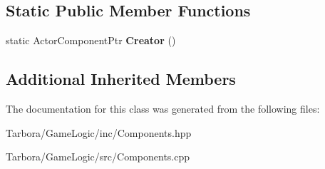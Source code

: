 \subsection*{Static Public Member Functions}
\begin{DoxyCompactItemize}
\item 
\mbox{\label{classTarbora_1_1ModelComponent_ad1ca161fc8a28d0dfd3da1d6a1ddca08}} 
static Actor\+Component\+Ptr {\bfseries Creator} ()
\end{DoxyCompactItemize}
\subsection*{Additional Inherited Members}


The documentation for this class was generated from the following files\+:\begin{DoxyCompactItemize}
\item 
Tarbora/\+Game\+Logic/inc/Components.\+hpp\item 
Tarbora/\+Game\+Logic/src/Components.\+cpp\end{DoxyCompactItemize}
